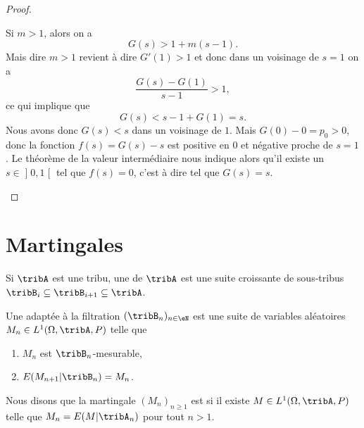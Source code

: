 \begin{proof}
\begin{subproof}
    Si \( m>1\), alors on a
    \begin{equation}
        G(s)>1+m(s-1).
    \end{equation}
    Mais dire \( m>1\) revient à dire \( G'(1)>1\) et donc dans un voisinage de \( s=1\) on a
    \begin{equation}
        \frac{ G(s)-G(1) }{ s-1 }>1,
    \end{equation}
    ce qui implique que
    \begin{equation}
        G(s)<s-1+G(1)=s.
    \end{equation}
    Nous avons donc \( G(s)<s\) dans un voisinage de \( 1\). Mais \( G(0)-0=p_0>0\), donc la fonction \( f(s)=G(s)-s\) est positive en \( 0\) et négative proche de \( s=1\). Le théorème de la valeur intermédiaire nous indique alors qu'il existe un \( s\in \mathopen] 0 , 1 \mathclose[\) tel que \( f(s)=0\), c'est à dire tel que \( G(s)=s\).
    \end{subproof}
\end{proof}

\section{Martingales}

\begin{definition}
    Si \( \tribA\) est une tribu, une  de \( \tribA\) est une suite croissante de sous-tribus \( \tribB_i\subseteq\tribB_{i+1}\subseteq\tribA\).
\end{definition}

\begin{definition}
    Une  adaptée à la filtration \( (\tribB_n)_{n\in \eN}\) est une suite de variables aléatoires \( M_n\in L^1(\Omega,\tribA,P)\) telle que
    \begin{enumerate}
        \item
            \( M_n\) est \( \tribB_n\)-mesurable,
        \item
            \( E(M_{n+1}|\tribB_n)=M_n\).
    \end{enumerate}
    Nous disons que la martingale \( (M_n)_{n\geq 1}\) est  si il existe \( M\in L^1(\Omega,\tribA,P)\) telle que \( M_n=E(M|\tribA_n)\) pour tout \( n>1\).
\end{definition}

